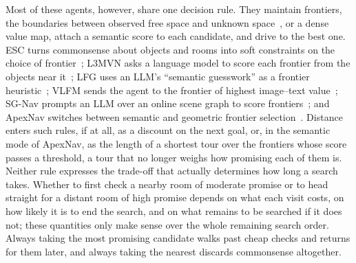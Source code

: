 \documentclass[10pt]{article}
\begin{document}
Most of these agents, however, share one decision rule. They maintain frontiers, the boundaries between observed
free space and unknown space~\citep{yamauchi1997frontier}, or a dense value map, attach a semantic score to each
candidate, and drive to the best one. ESC turns commonsense about objects and rooms into soft constraints on the
choice of frontier~\citep{zhou2023esc}; L3MVN asks a language model to score each frontier from the objects near
it~\citep{yu2023l3mvn}; LFG uses an LLM's ``semantic guesswork'' as a frontier heuristic~\citep{shah2023navigation};
VLFM sends the agent to the frontier of highest image--text value~\citep{yokoyama2024vlfm}; SG-Nav prompts an LLM over
an online scene graph to score frontiers~\citep{yin2024sg}; and ApexNav switches between semantic and geometric
frontier selection~\citep{zhang2025apexnav}. Distance enters such rules, if at all, as a discount on the next goal,
or, in the semantic mode of ApexNav, as the length of a shortest tour over the frontiers whose score passes a
threshold, a tour that no longer weighs how promising each of them is. Neither rule expresses the trade-off that
actually determines how long a search takes. Whether to first check a nearby room of moderate promise or to head
straight for a distant room of high promise depends on what each visit costs, on how likely it is to end the search, and on what remains to be searched if it does not; these
quantities only make sense over the whole remaining search order. Always taking the most promising candidate walks
past cheap checks and returns for them later, and always taking the nearest discards commonsense altogether.
\end{document}
